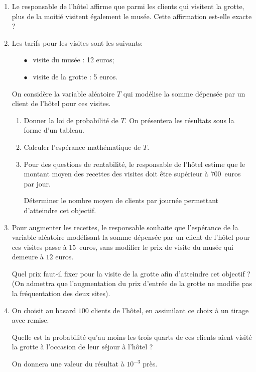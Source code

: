 \documentclass[10pt,a4paper]{article}
\begin{document}
\begin{enumerate}[resume,start=2]
\item Le responsable de l'hôtel affirme que parmi les clients qui visitent la grotte, plus de la moitié visitent également le musée. Cette affirmation est-elle exacte ?
\item Les tarifs pour les visites sont les suivants:

\begin{itemize}
\item[$\bullet~~$] visite du musée : 12 euros;
\item[$\bullet~~$] visite de la grotte : 5 euros.
\end{itemize}

On considère la variable aléatoire $T$ qui modélise la somme dépensée par un client de l'hôtel pour ces visites.
	\begin{enumerate}
		\item Donner la loi de probabilité de $T$. On présentera les résultats sous la forme d'un tableau.
		\item Calculer l'espérance mathématique de $T$.
		\item Pour des questions de rentabilité, le responsable de l'hôtel estime que le montant
moyen des recettes des visites doit être supérieur à $700$~euros par jour.

Déterminer le nombre moyen de clients par journée permettant d'atteindre cet objectif.
	\end{enumerate}
\item Pour augmenter les recettes, le responsable souhaite que l'espérance de la variable aléatoire modélisant la somme dépensée par un client de l'hôtel pour ces visites passe à $15$~euros, sans modifier le prix de visite du musée qui demeure à $12$ euros. 

Quel prix faut-il fixer pour la visite de la grotte afin d'atteindre cet objectif ? (On admettra que l'augmentation du prix d'entrée de la grotte ne modifie pas la fréquentation des deux sites).
\item On choisit au hasard $100$ clients de l'hôtel, en assimilant ce choix à un tirage avec remise.

Quelle est la probabilité qu'au moins les trois quarts de ces clients aient visité la grotte à l'occasion de leur séjour à l'hôtel ? 

On donnera une valeur du résultat à $10^{-3}$ près.
\end{enumerate}
\end{document}
